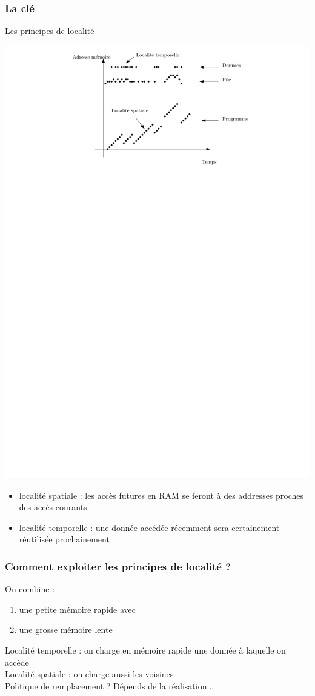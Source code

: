 \documentclass{beamer}
\begin{document}
\begin{frame}
\frametitle{La clé}
\begin{block}{Les principes de localité}

\centering\includegraphics[width=0.5\linewidth]{Figs/localite.pdf}

\begin{itemize}
\item localité spatiale : les accès futures en RAM se feront à des addresses proches des accès courants
\item localité temporelle : une donnée accédée récemment sera certainement réutilisée prochainement
\end{itemize}
\end{block}
\end{frame}

\begin{frame}
\frametitle{Comment exploiter les principes de localité ?}
On combine :
\begin{enumerate}
\item une petite mémoire rapide avec 
\item une grosse mémoire lente
\end{enumerate}
Localité temporelle : on charge en mémoire rapide une donnée à laquelle on accède\\
Localité spatiale : on charge aussi les voisines\\
Politique de remplacement ? Dépends de la réalisation...
\end{frame}
\end{document}
